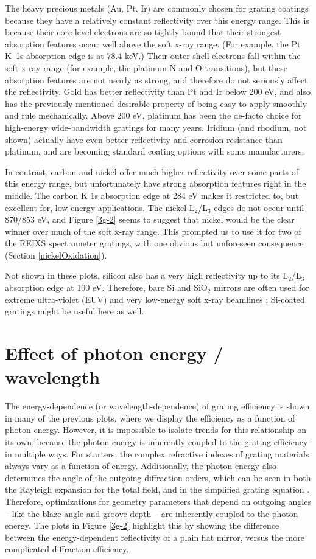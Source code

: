 The heavy precious metals (Au, Pt, Ir) are commonly chosen for grating coatings because they have a relatively constant reflectivity over this energy range.  This is because their core-level electrons are so tightly bound that their strongest absorption features occur well above the soft x-ray range.  (For example, the Pt K~1s absorption edge is at 78.4 keV.)  Their outer-shell electrons fall within the soft x-ray range (for example, the platinum N and O transitions), but these absorption features are not nearly as strong, and therefore do not seriously affect the reflectivity.  Gold has better reflectivity than Pt and Ir below 200 eV, and also has the previously-mentioned desirable property of being easy to apply smoothly and rule mechanically.  Above 200 eV, platinum has been the de-facto choice for high-energy wide-bandwidth gratings for many years.  Iridium (and rhodium, not shown) actually have even better reflectivity and corrosion resistance than platinum, and are becoming standard coating options with some manufacturers.

In contrast, carbon and nickel offer much higher reflectivity over some parts of this energy range, but unfortunately have strong absorption features right in the middle.  The carbon K 1s absorption edge at 284 eV makes it restricted to, but excellent for, low-energy applications.  The nickel L$_2$/L$_3$ edges do not occur until 870/853 eV, and Figure \ref{3g-2} seems to suggest that nickel would be the clear winner over much of the soft x-ray range.  This prompted us to use it for two of the REIXS spectrometer gratings, with one obvious but unforeseen consequence (Section \ref{nickelOxidation}).

Not shown in these plots, silicon also has a very high reflectivity up to its L$_2$/L$_3$ absorption edge at 100 eV. Therefore, bare Si and SiO$_2$ mirrors are often used for extreme ultra-violet (EUV) and very low-energy soft x-ray beamlines \cite{Pea97}; Si-coated gratings might be useful here as well.

\section{Effect of photon energy / wavelength}
The energy-dependence (or wavelength-dependence) of grating efficiency is shown in many of the previous plots, where we display the efficiency as a function of photon energy.  However, it is impossible to isolate trends for this relationship on its own, because the photon energy is inherently coupled to the grating efficiency in multiple ways.  For starters, the complex refractive indexes of grating materials always vary as a function of energy.  Additionally, the photon energy also determines the angle of the outgoing diffraction orders, which can be seen in both the Rayleigh expansion for the total field, and in the simplified grating equation .  Therefore, optimizations for geometry parameters that depend on outgoing angles -- like the blaze angle and groove depth -- are inherently coupled to the photon energy.  The plots in Figure \ref{3g-2} highlight this by showing the difference between the energy-dependent reflectivity of a plain flat mirror, versus the more complicated diffraction efficiency.

